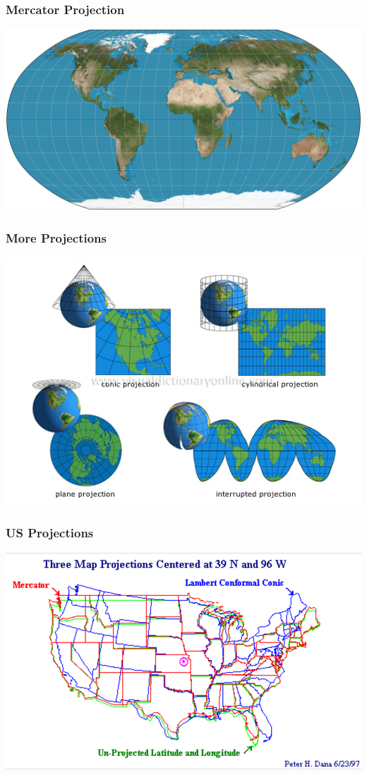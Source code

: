 \documentclass{beamer} %
\begin{document}
\begin{frame}\frametitle{Mercator Projection}
	\includegraphics[width=\linewidth]{robinson.jpg}
\end{frame}





\begin{frame}\frametitle{More Projections}
	\includegraphics[width=\linewidth]{projections2.jpg}
\end{frame}





\begin{frame}\frametitle{US Projections}
	\includegraphics[width=\linewidth]{us.png}
\end{frame}
\end{document}
